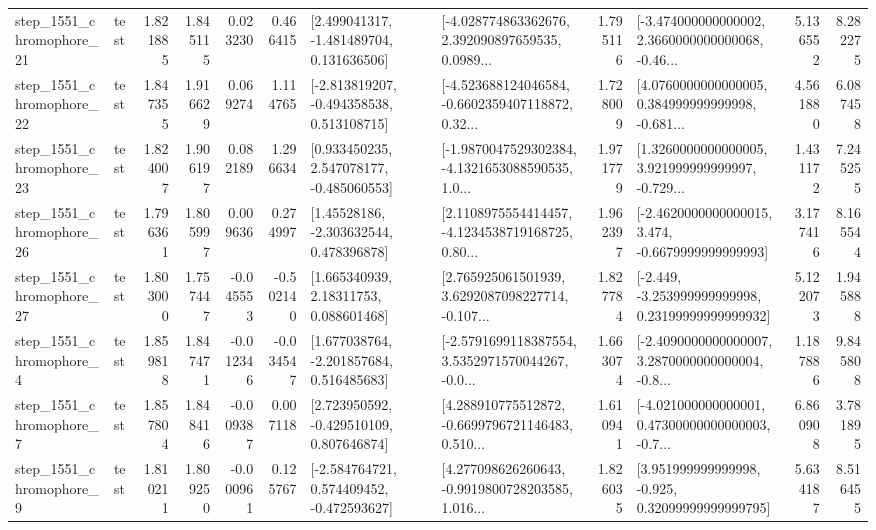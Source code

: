 \begin{tabular}{llrrrrllrlrr}
 step\_1551\_chromophore\_21 &      test &      1.821885 &    1.845115 &      0.023230 &  0.466415 &    [2.499041317, -1.481489704, 0.131636506] &  [-4.028774863362676, 2.392090897659535, 0.0989... &       1.795116 &  [-3.474000000000002, 2.3660000000000068, -0.46... &            5.136552 &          8.282275 \\
 step\_1551\_chromophore\_22 &      test &      1.847355 &    1.916629 &      0.069274 &  1.114765 &   [-2.813819207, -0.494358538, 0.513108715] &  [-4.523688124046584, -0.6602359407118872, 0.32... &       1.728009 &  [4.0760000000000005, 0.384999999999998, -0.681... &            4.561880 &          6.087458 \\
 step\_1551\_chromophore\_23 &      test &      1.824007 &    1.906197 &      0.082189 &  1.296634 &    [0.933450235, 2.547078177, -0.485060553] &  [-1.9870047529302384, -4.1321653088590535, 1.0... &       1.971779 &  [1.3260000000000005, 3.921999999999997, -0.729... &            1.431172 &          7.245255 \\
 step\_1551\_chromophore\_26 &      test &      1.796361 &    1.805997 &      0.009636 &  0.274997 &     [1.45528186, -2.303632544, 0.478396878] &  [2.1108975554414457, -4.1234538719168725, 0.80... &       1.962397 &  [-2.4620000000000015, 3.474, -0.6679999999999993] &            3.177416 &          8.165544 \\
 step\_1551\_chromophore\_27 &      test &      1.803000 &    1.757447 &     -0.045553 & -0.502140 &      [1.665340939, 2.18311753, 0.088601468] &  [2.765925061501939, 3.6292087098227714, -0.107... &       1.827784 &  [-2.449, -3.253999999999998, 0.23199999999999932] &            5.122073 &          1.945888 \\
  step\_1551\_chromophore\_4 &      test &      1.859818 &    1.847471 &     -0.012346 & -0.034547 &    [1.677038764, -2.201857684, 0.516485683] &  [-2.5791699118387554, 3.5352971570044267, -0.0... &       1.663074 &  [-2.4090000000000007, 3.2870000000000004, -0.8... &            1.187886 &          9.845808 \\
  step\_1551\_chromophore\_7 &      test &      1.857804 &    1.848416 &     -0.009387 &  0.007118 &    [2.723950592, -0.429510109, 0.807646874] &  [4.288910775512872, -0.6699796721146483, 0.510... &       1.610941 &  [-4.021000000000001, 0.47300000000000003, -0.7... &            6.860908 &          3.781895 \\
  step\_1551\_chromophore\_9 &      test &      1.810211 &    1.809250 &     -0.000961 &  0.125767 &   [-2.584764721, 0.574409452, -0.472593627] &  [4.277098626260643, -0.9919800728203585, 1.016... &       1.826035 &   [3.951999999999998, -0.925, 0.32099999999999795] &            5.634187 &          8.516455 \\

\end{tabular}
